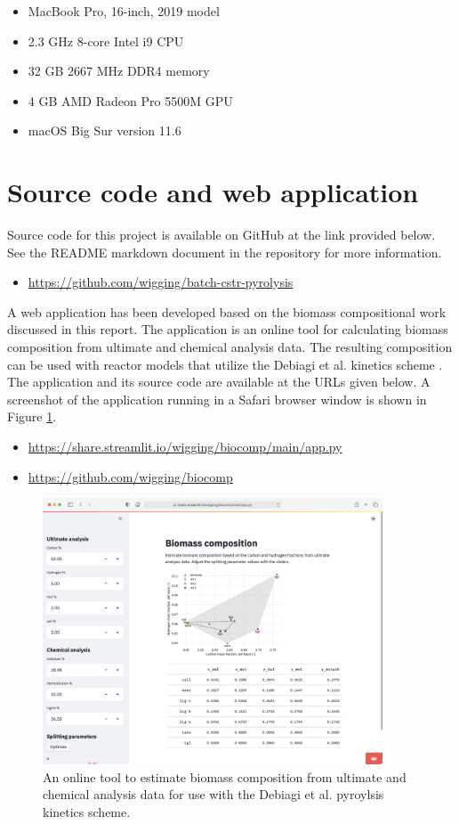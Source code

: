 \begin{itemize}
    \item MacBook Pro, 16-inch, 2019 model
    \item 2.3 GHz 8-core Intel i9 CPU
    \item 32 GB 2667 MHz DDR4 memory
    \item 4 GB AMD Radeon Pro 5500M GPU
    \item macOS Big Sur version 11.6
\end{itemize}

\section{Source code and web application}

Source code for this project is available on GitHub at the link provided below. See the README markdown document in the repository for more information.

\begin{itemize}
    \item \url{https://github.com/wigging/batch-cstr-pyrolysis}
\end{itemize}

A web application has been developed based on the biomass compositional work discussed in this report. The application is an online tool for calculating biomass composition from ultimate and chemical analysis data. The resulting composition can be used with reactor models that utilize the Debiagi et al. kinetics scheme \cite{Debiagi-2018}. The application and its source code are available at the URLs given below. A screenshot of the application running in a Safari browser window is shown in Figure \ref{fig:webtool}.

\begin{itemize}
    \item \url{https://share.streamlit.io/wigging/biocomp/main/app.py}
    \item \url{https://github.com/wigging/biocomp}
\end{itemize}

\begin{figure}[H]
    \centering
    \includegraphics[width=0.9\textwidth]{figures/webtool.png}
    \caption{An online tool to estimate biomass composition from ultimate and chemical analysis data for use with the Debiagi et al. pyroylsis kinetics scheme.}
    \label{fig:webtool}
\end{figure}
